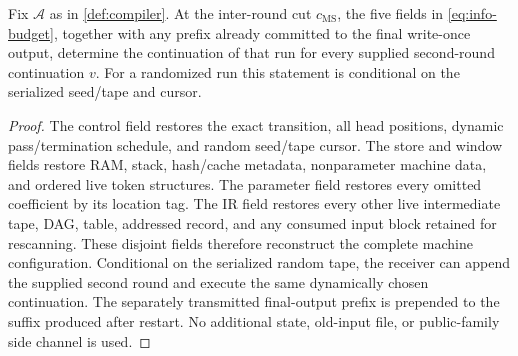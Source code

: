 \begin{lemma}
\label{app:lem:reconstruction}
Fix $\mathcal A$ as in \cref{def:compiler}.  At the inter-round cut
$c_{\mathrm{MS}}$, the five fields in \eqref{eq:info-budget}, together
with any prefix already committed to the final write-once output, determine
the continuation of that run for every supplied second-round continuation
$v$.  For a randomized run this statement is conditional on the serialized
seed/tape and cursor.
\end{lemma}

\begin{proof}
The control field restores the exact transition, all head positions,
dynamic pass/termination schedule, and random seed/tape cursor.  The store
and window fields restore RAM, stack, hash/cache metadata, nonparameter
machine data, and ordered live token structures.  The parameter field
restores every omitted coefficient by its location tag.  The IR field
restores every other live intermediate tape, DAG, table, addressed record,
and any consumed input block retained for rescanning.  These disjoint fields
therefore reconstruct the complete machine configuration.  Conditional on
the serialized random tape, the receiver can append the supplied second
round and execute the same dynamically chosen continuation.  The separately
transmitted final-output prefix is prepended to the suffix produced after
restart.  No additional state, old-input file, or public-family side channel
is used.
\end{proof}
